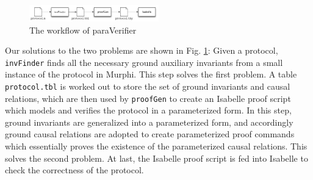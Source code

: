 \documentclass[final]{IEEEtran}
\begin{document}
{\begin{figure}[htbp]
\centering %
\includegraphics[width=0.5\textwidth]{paraVerifier.pdf}
\vspace{-0.6cm}
\caption{The workflow of {\sf paraVerifier} \label{fig:arch}
}
\end{figure}

Our solutions to the two problems are shown in Fig. \ref{fig:arch}:
Given a protocol,  \texttt{invFinder} finds all the necessary ground auxiliary invariants from a small instance of the protocol in Murphi. This step solves the first  problem.
 A table {\tt protocol.tbl} is worked out  to store the set of ground invariants and
 causal relations, which are then  used by {\tt proofGen} to
create an Isabelle proof   script which models and verifies the
protocol in a parameterized form. In this step, ground invariants
are generalized into a parameterized form, and accordingly
ground causal relations are adopted to create parameterized
proof commands which essentially proves the existence of the
parameterized causal relations. This solves the second problem.  At last, the Isabelle proof script is
fed into Isabelle to check the correctness of the protocol.

}
\end{document}
